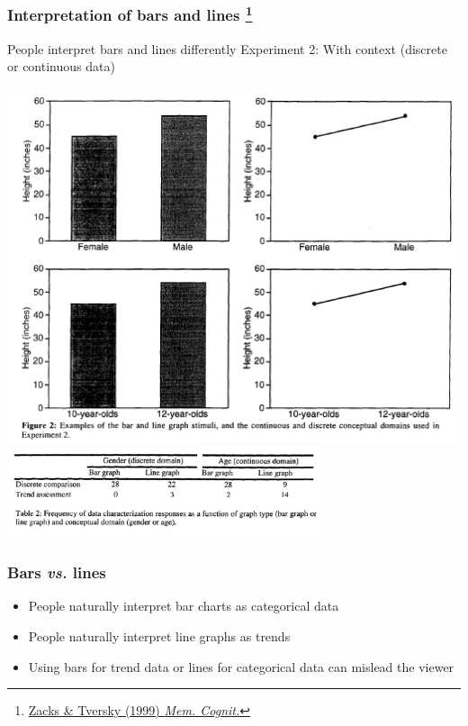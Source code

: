 \begin{frame}
  \frametitle{Interpretation of bars and lines
  \footnote{\tiny{\href{http://link.springer.com/article/10.3758/BF03201236}{Zacks \& Tversky (1999) \textit{Mem. Cognit.}}}}
  }
  \begin{alertblock}{People interpret bars and lines differently}
  Experiment 2: With context (discrete or continuous data)\\
    \begin{center}
      \includegraphics[height=0.4\textheight,valign=t]{images/bars_v_lines_expt2} \\
      \includegraphics[width=0.7\textwidth,valign=t]{images/bars_v_lines_table}  
    \end{center}
  \end{alertblock}
  \begin{center}
  \end{center}
\end{frame}

\begin{frame}
  \frametitle{Bars \textit{ vs.} lines}
    \begin{itemize}  
      \item People naturally interpret bar charts as categorical data
      \item People naturally interpret line graphs as trends
      \item Using bars for trend data or lines for categorical data can mislead the viewer
    \end{itemize}  
\end{frame}

